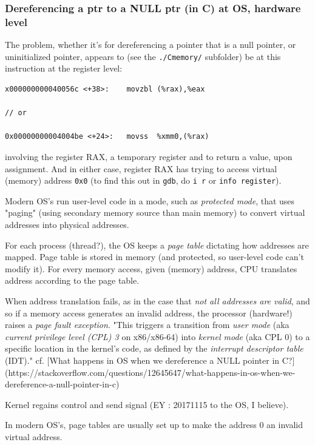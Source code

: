 \documentclass[10pt]{amsart}
\begin{document}
\begin{multicols*}{2}
\subsubsection{Dereferencing a ptr to a NULL ptr (in C) at OS, hardware level}

  
The problem, whether it's for dereferencing a pointer that is a null pointer, or uninitialized pointer, appears to (see the \verb|./Cmemory/| subfolder) be at this instruction at the register level:  

\begin{lstlisting}
x000000000040056c <+38>:	movzbl (%rax),%eax

// or 

0x00000000004004be <+24>:	movss  %xmm0,(%rax)  
\end{lstlisting}

involving the register RAX, a temporary register and to return a value, upon assignment.  And in either case, register RAX has trying to access virtual (memory) address \verb|0x0| (to find this out in \verb|gdb|, do \verb|i r| or \verb|info register|).  

Modern OS's run user-level code in a mode, such as \emph{protected mode}, that uses "paging" (using secondary memory source than main memory) to convert virtual addresses into physical addresses.  

For each process (thread?), the OS keeps a \emph{page table} dictating how addresses are mapped.  Page table is stored in memory (and protected, so user-level code can't modify it).  For every memory access, given (memory) address, CPU translates address according to the page table.  

When address translation fails, as in the case that \emph{not all addresses are valid}, and so if a memory access generates an invalid address, the processor (hardware!) raises a \emph{page fault exception}.  "This triggers a transition from \emph{user mode} (aka \emph{current privilege level (CPL) 3} on x86/x86-64) into \emph{kernel mode} (aka CPL 0) to a specific location in the kernel's code, as defined by the \emph{interrupt descriptor table} (IDT)."  cf. [What happens in OS when we dereference a NULL pointer in C?](https://stackoverflow.com/questions/12645647/what-happens-in-os-when-we-dereference-a-null-pointer-in-c)


Kernel regains control and send signal (EY : 20171115 to the OS, I believe).   

In modern OS's, page tables are usually set up to make the address 0 an invalid virtual address.  


\end{multicols*}
\end{document}
